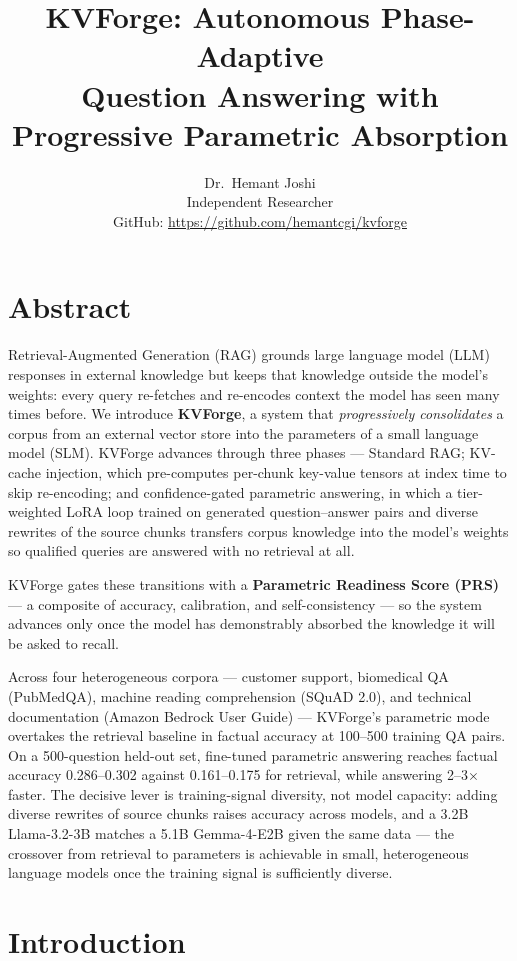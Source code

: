 \documentclass[10pt,twocolumn]{article}
\title{\Large\textbf{KVForge: Autonomous Phase-Adaptive\\
       Question Answering with Progressive Parametric Absorption}}
\author{Dr.\ Hemant Joshi\\[2pt]
        {\small Independent Researcher}\\[2pt]
        {\small GitHub: \url{https://github.com/hemantcgi/kvforge}}}
\date{}
\begin{document}
\maketitle
\thispagestyle{fancy}
\section*{Abstract}

Retrieval-Augmented Generation (RAG) grounds large language model (LLM) responses in external knowledge but keeps that knowledge outside the model's weights: every query re-fetches and re-encodes context the model has seen many times before. We introduce \textbf{KVForge}, a system that \textit{progressively consolidates} a corpus from an external vector store into the parameters of a small language model (SLM). KVForge advances through three phases --- Standard RAG; KV-cache injection, which pre-computes per-chunk key-value tensors at index time to skip re-encoding; and confidence-gated parametric answering, in which a tier-weighted LoRA loop trained on generated question--answer pairs and diverse rewrites of the source chunks transfers corpus knowledge into the model's weights so qualified queries are answered with no retrieval at all.


KVForge gates these transitions with a \textbf{Parametric Readiness Score (PRS)} --- a composite of accuracy, calibration, and self-consistency --- so the system advances only once the model has demonstrably absorbed the knowledge it will be asked to recall.


Across four heterogeneous corpora --- customer support, biomedical QA (PubMedQA), machine reading comprehension (SQuAD 2.0), and technical documentation (Amazon Bedrock User Guide) --- KVForge's parametric mode overtakes the retrieval baseline in factual accuracy at 100--500 training QA pairs. On a 500-question held-out set, fine-tuned parametric answering reaches factual accuracy 0.286--0.302 against 0.161--0.175 for retrieval, while answering 2--3$\times$ faster. The decisive lever is training-signal diversity, not model capacity: adding diverse rewrites of source chunks raises accuracy across models, and a 3.2B Llama-3.2-3B matches a 5.1B Gemma-4-E2B given the same data --- the crossover from retrieval to parameters is achievable in small, heterogeneous language models once the training signal is sufficiently diverse.



\smallskip

\section{Introduction}
\end{document}
